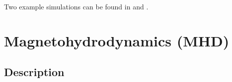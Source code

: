 Two example simulations can be found in  and .

% 


\section{Magnetohydrodynamics (MHD)}
\subsection{Description}
\label{Sec:MHD description}

